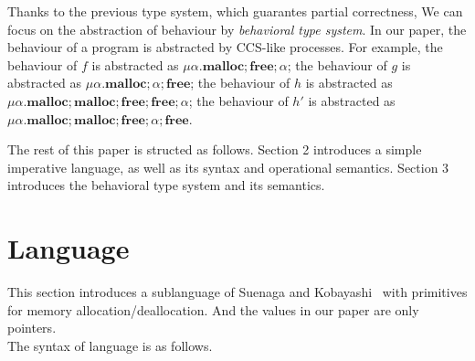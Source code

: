 \documentclass[english]{jssst_ppl} %
\newcommand\Malloc{\mathbf{malloc}}
\newcommand\Free{\mathbf{free}}
\begin{document}
Thanks to the previous type system, which guarantes partial correctness, We can focus on the abstraction of behaviour by \emph{behavioral type system}. In our paper, the behaviour of a program is abstracted by CCS-like processes. For example, the behaviour of $f$ is abstracted as $\mu \alpha. \Malloc;\Free;\alpha$; the behaviour of $g$ is abstracted as $\mu \alpha. \Malloc;\alpha;\Free$; the behaviour of $h$ is abstracted as $\mu \alpha. \Malloc;\Malloc;\Free;\Free;\alpha$; the behaviour of $h'$ is abstracted as $\mu \alpha. \Malloc;\Malloc;\Free;\alpha;\Free$.

The rest of this paper is structed as follows. Section 2 introduces a simple imperative language, as well as its syntax and operational semantics. Section 3 introduces the behavioral type system and its semantics.

\section{Language}
This section introduces a sublanguage of Suenaga and Kobayashi~\cite{DBLP:conf/aplas/SuenagaK09} with primitives for memory allocation/deallocation. And the values in our paper are only pointers. \\
The syntax of language is as follows.
\end{document}
